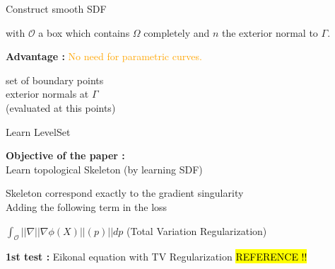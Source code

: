 \begin{frame}[allowframebreaks]{Construct smooth SDF}
\begin{tcolorbox}
			with $\mathcal{O}$ a box which contains $\Omega$ completely and $n$ the exterior normal to $\Gamma$.
		\end{tcolorbox}
		
		\textbf{Advantage :} \textcolor{orange}{No need for parametric curves.}
		
		\begin{minipage}{0.48\linewidth}
			\centering
		\end{minipage} 
		\begin{minipage}{0.48\linewidth}
			 set of boundary points \\
			 exterior normals at $\Gamma$ \\
			(evaluated at this points)
		\end{minipage}
\end{frame}

\begin{frame}{Learn LevelSet }
	\begin{minipage}{0.78\linewidth}
		\vspace{5pt}
		\textbf{Objective of the paper :} \\
		Learn topological Skeleton (by learning SDF) \quad {}
	\end{minipage} \begin{minipage}{0.18\linewidth}	
		\vspace{-30pt}
		\hspace{70pt}
	\end{minipage}
	
	 Skeleton correspond exactly to the gradient singularity \\
	 Adding the following term in the loss \\
	\begin{minipage}{0.38\linewidth}
		\centering
		$\int_\mathcal{O} ||\nabla||\nabla\phi(X)||(p)||dp$
		\flushright
		(Total Variation Regularization)
	\end{minipage} \quad \begin{minipage}{0.58\linewidth}	
		\vspace{-15pt}
		\flushright
	\end{minipage}

	\vspace{8pt}

	\textbf{1st test :} Eikonal equation with TV Regularization \hl{REFERENCE !!} 
	
	\begin{minipage}{0.26\linewidth}
	\end{minipage} \quad \begin{minipage}{0.70\linewidth}	
	\end{minipage}
\end{frame}

